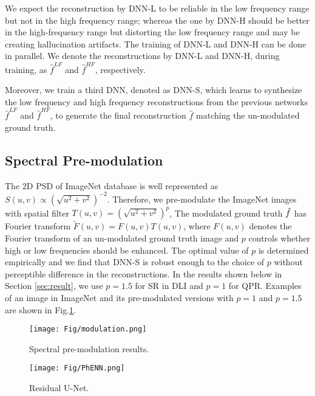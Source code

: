 \documentclass[10pt,twocolumn,letterpaper]{article}
\begin{document}
We expect the reconstruction by DNN-L to be reliable in the low frequency range but not in the high frequency range; whereas the one by DNN-H should be better in the high-frequency range but distorting the low frequency range and may be creating hallucination artifacts. The training of DNN-L and DNN-H can be done in parallel. We denote the reconstructions by DNN-L and DNN-H, during  training, as $\hat{f}^{LF}$ and $\hat{f}^{HF}$, respectively.

Moreover, we train a third DNN, denoted as DNN-S, which learns to synthesize the low frequency and high frequency reconstructions from the previous networks $\hat{f}^{LF}$ and $\hat{f}^{HF}$, to generate the final reconstruction $\hat{f}$ matching the un-modulated ground truth. 

\subsection{Spectral Pre-modulation}
\label{sec:modu}
The 2D PSD of ImageNet database is well represented as
$S(u,v)\propto (\sqrt{u^2+v^2})^{-2}$. 
Therefore, we pre-modulate the ImageNet images with spatial filter $T(u,v)=(\sqrt{u^2+v^2})^{p}$, The modulated ground truth $\Tilde{f}$ has Fourier transform $\tilde{F}(u,v)=F(u,v)T(u,v)$, where $F(u,v)$ denotes the Fourier transform of an un-modulated ground truth image and $p$ controls whether high or low frequencies should be enhanced. The optimal value of $p$ is determined empirically and we find that DNN-S is robust enough to the choice of $p$ without perceptible difference in the reconstructions. In the results shown below in Section \ref{sec:result}, we use $p=1.5$ for SR in DLI and $p=1$ for QPR. Examples of an image in ImageNet and its pre-modulated versions with $p=1$ and $p=1.5$ are shown in Fig.\ref{fig:spm}. 

\begin{figure}[h!]
\centering\texttt{[image: Fig/modulation.png]}
\caption{Spectral pre-modulation results.}
\label{fig:spm}
\end{figure}
\begin{figure}[h!]
\centering\texttt{[image: Fig/PhENN.png]}
\caption{Residual U-Net.}
\label{fig:PHENN}
\end{figure}
\end{document}
